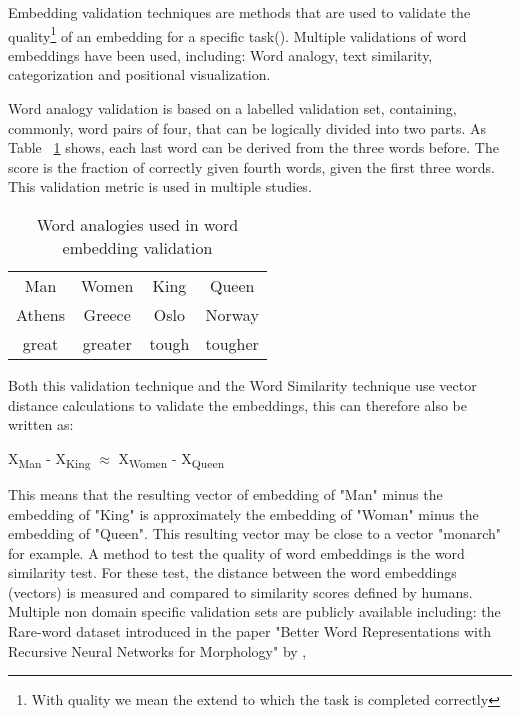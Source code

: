 \documentclass[../../Thesis.tex]{subfiles}
\begin{document}
Embedding validation techniques are methods that are used to validate the quality\footnote{With quality we mean the extend to which the task is completed correctly} of an embedding for a specific task(\citet{schnabel2015evaluation}).
Multiple validations of word embeddings have been used, including: Word analogy, text similarity, categorization and positional visualization.
\begin{jumpin}
Word analogy validation is based on a labelled validation set, containing, commonly, word pairs of four, that can be logically divided into two parts. As  Table
~\ref{table:wordAnalogies} shows, each last word can be derived from the three words before. The score is the fraction of correctly given fourth words, given the first three words. This validation metric is used in multiple studies\cite{mikolov2013distributed, mikolov2013efficient, dai2015document, pennington2014glove}.
\begin{table}
\begin{center}
\begin{tabular}{c c c c}
Man & Women & King & Queen \\
Athens & Greece & Oslo & Norway\\
great & greater & tough & tougher
\end{tabular}
\end{center}
\caption{Word analogies used in word embedding validation}\label{table:wordAnalogies}
\end{table}
Both this validation technique and the Word Similarity technique use vector distance calculations to validate the embeddings, this can therefore also be written as:
\begin{displayquote}
	X\textsubscript{Man} - X\textsubscript{King} $\approx$  X\textsubscript{Women} - X\textsubscript{Queen}
\end{displayquote}
This means that the resulting vector of embedding of "Man" minus the embedding of "King" is approximately the embedding of "Woman" minus the embedding of "Queen". This resulting vector may be close to a vector "monarch" for example.
A method to test the quality of word embeddings is the word similarity test. For these test, the distance between the word embeddings (vectors) is measured and compared to similarity scores defined by humans. Multiple non domain specific validation sets are publicly available including: the Rare-word dataset introduced in the paper "Better Word Representations with Recursive Neural Networks for Morphology" by \citet{luong2013better}, 

\end{jumpin}
\end{document}
